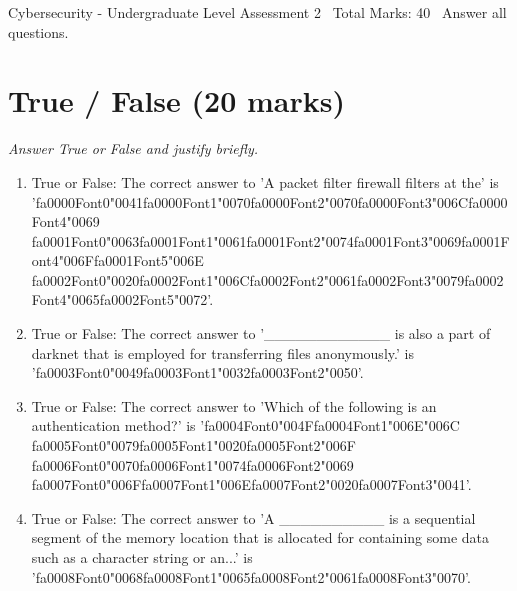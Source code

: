\documentclass[12pt]{article}
\begin{document}
\begin{center}
Cybersecurity - Undergraduate Level Assessment 2 \
Total Marks: 40 \
Answer all questions.
\end{center}

\section*{True / False (20 marks)}
\textit{Answer True or False and justify briefly.}
\begin{enumerate}[label=\arabic*.]
\item True or False: The correct answer to 'A packet filter firewall filters at the' is '{\csname fa0000Font0\endcsname\char"0041}{\csname fa0000Font1\endcsname\char"0070}{\csname fa0000Font2\endcsname\char"0070}{\csname fa0000Font3\endcsname\char"006C}{\csname fa0000Font4\endcsname\char"0069} {\csname fa0001Font0\endcsname\char"0063}{\csname fa0001Font1\endcsname\char"0061}{\csname fa0001Font2\endcsname\char"0074}{\csname fa0001Font3\endcsname\char"0069}{\csname fa0001Font4\endcsname\char"006F}{\csname fa0001Font5\endcsname\char"006E} {\csname fa0002Font0\endcsname\char"0020}{\csname fa0002Font1\endcsname\char"006C}{\csname fa0002Font2\endcsname\char"0061}{\csname fa0002Font3\endcsname\char"0079}{\csname fa0002Font4\endcsname\char"0065}{\csname fa0002Font5\endcsname\char"0072}'.
\item True or False: The correct answer to '\_\_\_\_\_\_\_\_\_\_\_\_ is also a part of darknet that is employed for transferring files anonymously.' is '{\csname fa0003Font0\endcsname\char"0049}{\csname fa0003Font1\endcsname\char"0032}{\csname fa0003Font2\endcsname\char"0050}'.
\item True or False: The correct answer to 'Which of the following is an authentication method?' is '{\csname fa0004Font0\endcsname\char"004F}{\csname fa0004Font1\endcsname\char"006E}{\char"006C} {\csname fa0005Font0\endcsname\char"0079}{\csname fa0005Font1\endcsname\char"0020}{\csname fa0005Font2\endcsname\char"006F} {\csname fa0006Font0\endcsname\char"0070}{\csname fa0006Font1\endcsname\char"0074}{\csname fa0006Font2\endcsname\char"0069} {\csname fa0007Font0\endcsname\char"006F}{\csname fa0007Font1\endcsname\char"006E}{\csname fa0007Font2\endcsname\char"0020}{\csname fa0007Font3\endcsname\char"0041}'.
\item True or False: The correct answer to 'A \_\_\_\_\_\_\_\_\_\_ is a sequential segment of the memory location that is allocated for containing some data such as a character string or an...' is '{\csname fa0008Font0\endcsname\char"0068}{\csname fa0008Font1\endcsname\char"0065}{\csname fa0008Font2\endcsname\char"0061}{\csname fa0008Font3\endcsname\char"0070}'.

\end{enumerate}
\end{document}
